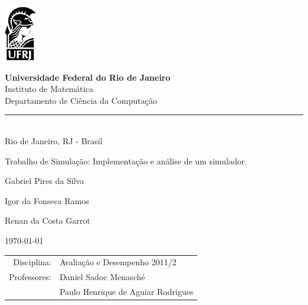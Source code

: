 \documentclass[a4paper,10pt]{article}
\begin{document}
\begin{titlepage}

\begin{minipage}{0.2\linewidth}
 \includegraphics[]{./minerva.png}
\end{minipage}
\begin{minipage}{0.8\linewidth}
 \textbf{Universidade Federal do Rio de Janeiro}\\
 Instituto de Matemática\\
 Departamento de Ciência da Computação\\
 \rule{0.8\linewidth}{0.5mm}\\
 Rio de Janeiro, RJ - Brasil
\end{minipage}

\begin{center}

\vspace{2cm}

\Large
Trabalho de Simulação: Implementação e análise de um simulador.

\vspace{1cm}

\large

Gabriel Pires da Silva

\vspace{0.5cm}

Igor da Fonseca Ramos

\vspace{0.5cm}

Renan da Costa Garrot

\vspace{2.5cm}

\today

\normalsize
\end{center}

\vfill

\begin{flushright}
\begin{tabular}{rl}
Disciplina: & Avaliação e Desempenho 2011/2\\
Professores: & Daniel Sadoc Menasché\\
 & Paulo Henrique de Aguiar Rodrigues\\
\end{tabular}
\end{flushright}

\vspace{2cm}

\end{titlepage}
\end{document}
